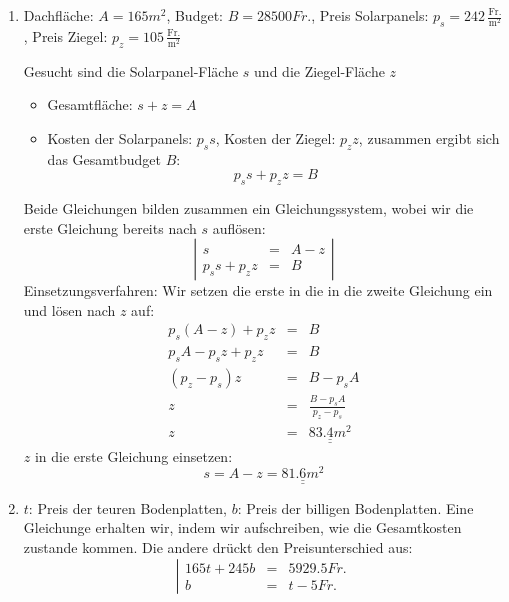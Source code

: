 \documentclass[%
11pt,%
twoside,%
titlepage,%
german,%
]{scrartcl}
\newcommand{\ufrac}[2]{\ensuremath{\,\frac{\mathrm{#1}}{\mathrm{#2}}}}
\newcommand{\result}[1]{\underline{\underline{#1}}}
\begin{document}
\begin{enumerate}
\begin{enumerate}
  \item Dachfl\"ache: $A=165\unit{m^2}$, Budget: $B=28500\unit{Fr.}$, Preis Solarpanels: $p_s=242\ufrac{Fr.}{m^2}$, Preis Ziegel: $p_z=105\ufrac{Fr.}{m^2}$

    Gesucht sind die Solarpanel-Fl\"ache $s$ und die Ziegel-Fl\"ache $z$
    \begin{itemize}
    \item Gesamtfl\"ache: $s+z=A$
    \item Kosten der Solarpanels: $p_s s$, Kosten der Ziegel: $p_z z$, zusammen ergibt sich das Gesamtbudget $B$:
      \begin{displaymath}
        p_s s + p_z z = B
      \end{displaymath}
    \end{itemize}
    Beide Gleichungen bilden zusammen ein Gleichungssystem, wobei wir die erste Gleichung bereits nach $s$ aufl\"osen:
    \begin{displaymath}
      \left| 
        \begin{array}{rcl}
          s & = & A-z \\
          p_s s + p_z z & = & B
        \end{array} \right|
    \end{displaymath}
    Einsetzungsverfahren: Wir setzen die erste in die in die zweite Gleichung ein und l\"osen nach $z$ auf:
    \begin{eqnarray*}
      p_s(A-z)+p_z z & = & B \\
      p_s A - p_s z + p_z z & = & B \\
      (p_z-p_s)z & = & B-p_s A \\
      z & = & \frac{B-p_s A}{p_z-p_s} \\
      z & = & \result{83.4\unit{m^2}}
    \end{eqnarray*}
    $z$ in die erste Gleichung einsetzen:
    \begin{displaymath}
      s = A - z = \result{81.6\unit{m^2}}
    \end{displaymath}
  \item $t$: Preis der teuren Bodenplatten, $b$: Preis der billigen Bodenplatten. Eine Gleichunge erhalten wir, indem wir aufschreiben, wie die Gesamtkosten zustande kommen. Die andere dr\"uckt den Preisunterschied aus:
    \begin{displaymath}
      \left| 
        \begin{array}{rcl}
          165t+245b & = & 5929.5\unit{Fr.} \\
          b & = & t - 5\unit{Fr.}

\end{array}
\end{displaymath}
\end{enumerate}
\end{enumerate}
\end{document}

